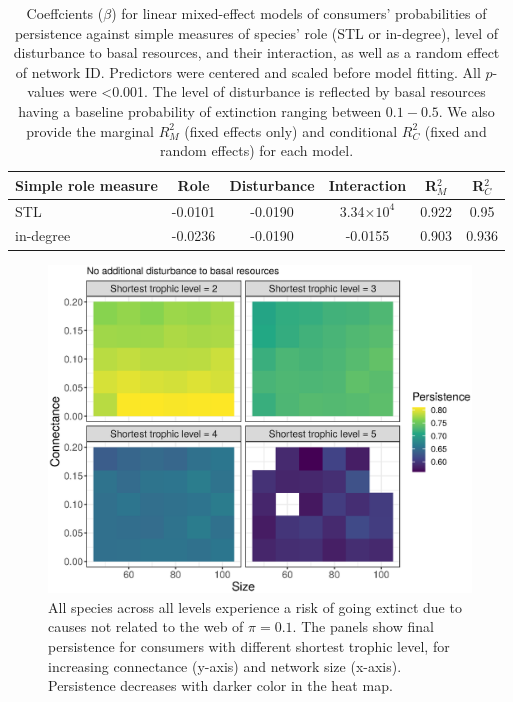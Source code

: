 \documentclass[12pt]{article}
\begin{document}
\begin{spacing}{2.0}
    \begin{table}[hb!]
        \caption{Coeffcients ($\beta$) for linear mixed-effect models of consumers' probabilities of persistence against simple measures of species' role (STL or in-degree), level of disturbance to basal resources, and their interaction, as well as a random effect of network ID. Predictors were centered and scaled before model fitting. All $p$-values were \textless0.001. The level of disturbance is reflected by basal resources having a baseline probability of extinction ranging between $0.1 - 0.5$.  We also provide the marginal $R^2_M$ (fixed effects only) and conditional $R^2_C$ (fixed and random effects) for each model.}
        \label{tab:per_vs_TLdeg}
        \centering
        \begin{tabular}{l|c  c  c | c c  }
            Simple role measure & Role & Disturbance & Interaction & R$^2_M$ & R$^2_C$ \\
            \hline
            STL & -0.0101 & -0.0190 & 3.34$\times10^{4}$ & 0.922 & 0.95 \\
            in-degree & -0.0236 & -0.0190 & -0.0155 & 0.903 & 0.936 \\
        \end{tabular}
    \end{table}


    \begin{figure}[hb!]
     \centering
     \includegraphics[width=.9\textwidth]{figures/heatmap_STL_allCS_BP0.eps}
     \caption{All species across all levels experience a risk of going extinct due to causes not related to the web of $\pi = 0.1$. The panels show final persistence for consumers with different shortest trophic level, for increasing connectance (y-axis) and network size (x-axis). Persistence decreases with darker color in the heat map.}
     \label{fig:heatmap_stl_BP0}
    \end{figure}



\end{spacing}
\end{document}
